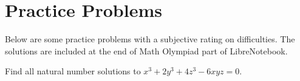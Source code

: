 \documentclass[../../../main.tex]{subfiles}
\begin{document}
\section{Practice Problems}

Below are some practice problems with a subjective rating on
difficulties. The solutions are included at the end of Math Olympiad
part of LibreNotebook.

\begin{listproblem}
Find all natural number solutions to $x^3 + 2y^3 + 4z^3 - 6xyz = 0$.
\end{listproblem}
\end{document}
